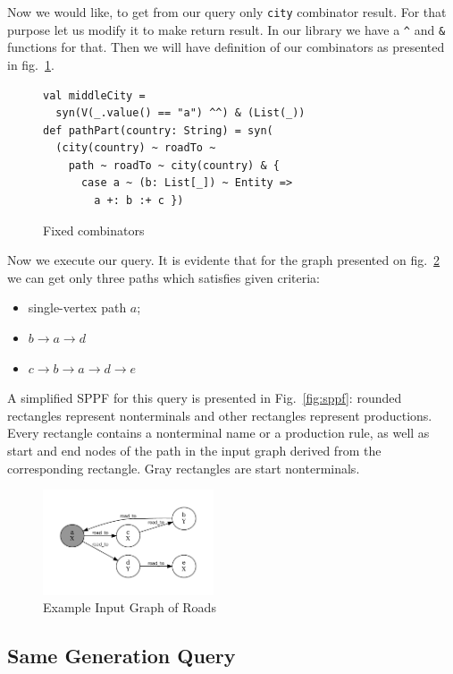 Now we would like, to get from our query only \lstinline{city} combinator result. 
For that purpose let us modify it to make return result. 
In our library we have a \lstinline{^} and \lstinline{&} functions for that. 
Then we will have definition of our combinators as presented in fig.~\ref{fig:fixedAtor}.

\begin{figure}[h]
\begin{lstlisting}
val middleCity = 
  syn(V(_.value() == "a") ^^) & (List(_))
def pathPart(country: String) = syn(
  (city(country) ~ roadTo ~ 
    path ~ roadTo ~ city(country) & {
      case a ~ (b: List[_]) ~ Entity => 
        a +: b :+ c })
\end{lstlisting}
\caption{Fixed combinators}
\label{fig:fixedAtor}
\end{figure}

Now we execute our query. It is evidente that for the graph presented on fig.~\ref{fig:graph} we can get only three paths which satisfies given criteria:
\begin{itemize}
\item single-vertex path $a$;
\item $b \rightarrow a \rightarrow d$
\item $c \rightarrow b \rightarrow a \rightarrow d \rightarrow e$
\end{itemize}

A simplified SPPF for this query is presented in Fig.~\ref{fig:sppf}: rounded rectangles represent nonterminals and other rectangles represent productions. 
Every rectangle contains a nonterminal name or a production rule, as well as start and end nodes of the path in the input graph derived from the corresponding rectangle. 
Gray rectangles are start nonterminals.

\begin{figure}[h]
\includegraphics[width=0.45\textwidth]{graph}
\caption{Example Input Graph of Roads}
\label{fig:graph}
\end{figure}


\subsection{Same Generation Query}

